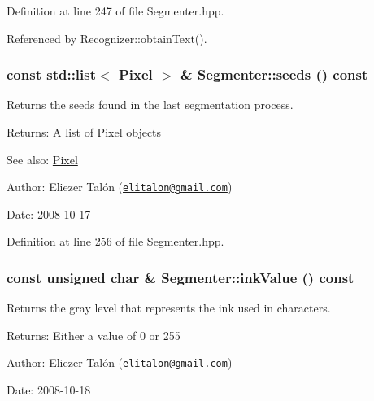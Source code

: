 Definition at line 247 of file Segmenter.hpp.

Referenced by Recognizer::obtainText().\hypertarget{class_segmenter_519d84c033b647342c3397a0bf479d9e}{
\subsubsection[seeds]{\setlength{\rightskip}{0pt plus 5cm}const std::list$<$ {\bf Pixel} $>$ \& Segmenter::seeds () const}}
\label{class_segmenter_519d84c033b647342c3397a0bf479d9e}


Returns the seeds found in the last segmentation process. 

\begin{Desc}
\item[Returns:]A list of Pixel objects\end{Desc}
\begin{Desc}
\item[See also:]\hyperlink{_pixel_8hpp_535e59456e3e633842529cfa8ea103c4}{Pixel}\end{Desc}
\begin{Desc}
\item[Author:]Eliezer Talón (\href{mailto:elitalon@gmail.com}{\tt elitalon@gmail.com}) \end{Desc}
\begin{Desc}
\item[Date:]2008-10-17 \end{Desc}


Definition at line 256 of file Segmenter.hpp.\hypertarget{class_segmenter_e9bc56ddcbe5ea4abb40fcc85e3d9fbe}{
\subsubsection[inkValue]{\setlength{\rightskip}{0pt plus 5cm}const unsigned char \& Segmenter::inkValue () const}}
\label{class_segmenter_e9bc56ddcbe5ea4abb40fcc85e3d9fbe}


Returns the gray level that represents the ink used in characters. 

\begin{Desc}
\item[Returns:]Either a value of 0 or 255\end{Desc}
\begin{Desc}
\item[Author:]Eliezer Talón (\href{mailto:elitalon@gmail.com}{\tt elitalon@gmail.com}) \end{Desc}
\begin{Desc}
\item[Date:]2008-10-18 \end{Desc}


